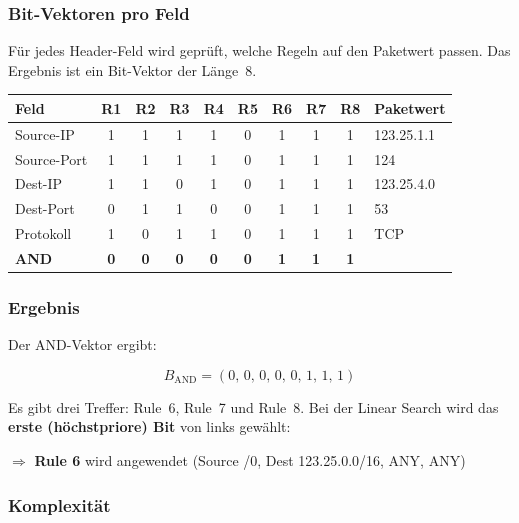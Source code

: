 \documentclass{article}
\begin{document}
\subsubsection*{Bit-Vektoren pro Feld}

F\"{u}r jedes Header-Feld wird gepr\"{u}ft, welche Regeln auf den Paketwert
passen. Das Ergebnis ist ein Bit-Vektor der L\"{a}nge~8.

\medskip
\begin{center}
\begin{tabular}{lccccccccl}
\toprule
\textbf{Feld} & \textbf{R1} & \textbf{R2} & \textbf{R3} & \textbf{R4} &
\textbf{R5} & \textbf{R6} & \textbf{R7} & \textbf{R8} & \textbf{Paketwert} \\
\midrule
Source-IP  & 1 & 1 & 1 & 1 & 0 & 1 & 1 & 1 & 123.25.1.1 \\
Source-Port & 1 & 1 & 1 & 1 & 0 & 1 & 1 & 1 & 124 \\
Dest-IP    & 1 & 1 & 0 & 1 & 0 & 1 & 1 & 1 & 123.25.4.0 \\
Dest-Port  & 0 & 1 & 1 & 0 & 0 & 1 & 1 & 1 & 53 \\
Protokoll  & 1 & 0 & 1 & 1 & 0 & 1 & 1 & 1 & TCP \\
\midrule
\textbf{AND} & \textbf{0} & \textbf{0} & \textbf{0} & \textbf{0} &
\textbf{0} & \textbf{1} & \textbf{1} & \textbf{1} & \\
\bottomrule
\end{tabular}
\end{center}

\subsubsection*{Ergebnis}

Der AND-Vektor ergibt:

\[
B_{\text{AND}} = (0,\, 0,\, 0,\, 0,\, 0,\, 1,\, 1,\, 1)
\]

Es gibt drei Treffer: Rule~6, Rule~7 und Rule~8. Bei der Linear Search wird
das \textbf{erste (h\"{o}chstpriore) Bit} von links gew\"{a}hlt:

\medskip
\begin{center}
$\Rightarrow$ \textbf{Rule 6} wird angewendet
\quad (Source /0, Dest 123.25.0.0/16, ANY, ANY)
\end{center}

\subsubsection*{Komplexit\"{a}t}
\end{document}
